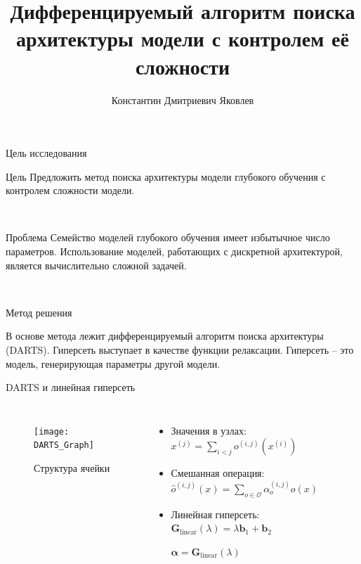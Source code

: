 \documentclass{beamer}
\title[\hbox to 56mm{Алгоритм поиска архитектуры}]{Дифференцируемый алгоритм поиска архитектуры модели с контролем её сложности}
\author[К.\,Д. Яковлев]{Константин Дмитриевич Яковлев}
\institute{Московский физико-технический институт}
\date{\footnotesize
\par\smallskip\emph{Курс:} Автоматизация научных исследований\par (практика, В.\,В.~Стрижов)/Группа 874
\par\smallskip\emph{Эксперт:} В.\,В.~Стрижов
\par\smallskip\emph{Консультант:} О.\,С.~Гребенькова, ~ О.\,Ю.~Бахтеев
\par\bigskip\small 2021}
\begin{document}
\begin{frame}
\thispagestyle{empty}
\maketitle
\end{frame}
\begin{frame}{Цель исследования}
\begin{block}{Цель} 
Предложить метод поиска архитектуры модели глубокого обучения с контролем сложности модели.
\end{block}

~\\
\begin{block}{Проблема}
Семейство моделей глубокого обучения имеет избытычное число параметров. Использование моделей, работающих с дискретной архитектурой, является вычислительно сложной задачей.
\end{block}
~\\
\begin{block}{Метод решения}

В основе метода лежит дифференцируемый алгоритм поиска архитектуры (DARTS). Гиперсеть выступает в качестве функции релаксации. Гиперсеть -- это модель, генерирующая параметры другой модели. 
\end{block}

\end{frame}
\begin{frame}{DARTS и линейная гиперсеть}

\begin{columns}[c]
\begin{figure}
	\texttt{[image: DARTS\_Graph]}
	\caption{Структура ячейки}
\end{figure}


\begin{itemize}
\item Значения в узлах: $x^{(j)} = \sum_{i < j}o^{(i, j)}(x^{(i)})$

\item Смешанная операция: $\hat{o}^{(i, j)}(x) = \sum_{o\in\mathcal{O}}\alpha^{(i, j)}_oo(x)$

\item Линейная гиперсеть: $\mathbf{G}_{\text{linear}}(\lambda) = \lambda\mathbf{b}_1 + \mathbf{b}_2$

$\mathbf{\alpha} = \mathbf{G}_\text{linear}(\lambda)$

\end{itemize}


\end{columns}
\end{frame}
\end{document}
